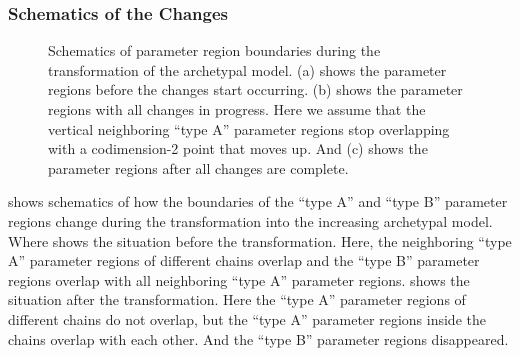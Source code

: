 \subsubsection{Schematics of the Changes}

\begin{figure}
	\centering
	\caption[Schematics of parameter region boundaries during the transformation of the archetypal model]{
		Schematics of parameter region boundaries during the transformation of the archetypal model.
		(a) shows the parameter regions before the changes start occurring.
		(b) shows the parameter regions with all changes in progress.
		Here we assume that the vertical neighboring ``type A'' parameter regions stop overlapping with a codimension-2 point that moves up.
		And (c) shows the parameter regions after all changes are complete.
	}
	\label{fig:add.change.schema}
\end{figure}

 shows schematics of how the boundaries of the ``type A'' and ``type B'' parameter regions change during the transformation into the increasing archetypal model.
Where  shows the situation before the transformation.
Here, the neighboring ``type A'' parameter regions of different chains overlap and the ``type B'' parameter regions overlap with all neighboring ``type A'' parameter regions.
 shows the situation after the transformation.
Here the ``type A'' parameter regions of different chains do not overlap, but the ``type A'' parameter regions inside the chains overlap with each other.
And the ``type B'' parameter regions disappeared.

